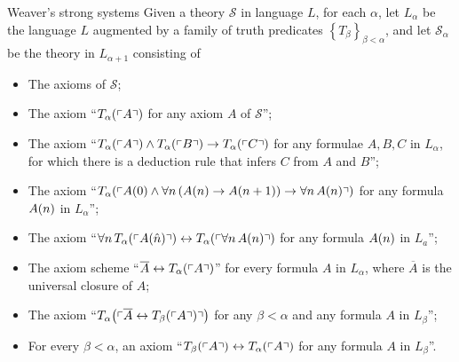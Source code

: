 \documentclass{beamer}
\begin{document}
\begin{frame}{Weaver's strong systems}
  Given a theory $\mathcal{S}$ in language $L$, for each $\alpha$, let $L_\alpha$ be the language $L$ augmented by a family of truth predicates $\left\{T_\beta\right\}_{\beta < \alpha}$, and let $\mathcal{S}_\alpha$ be the theory in $L_{\alpha + 1}$ consisting of
  \begin{itemize}
    \small
    \item The axioms of $\mathcal{S}$;
    \item The axiom ``$T_\alpha\mleft(\left\ulcorner A \right\urcorner\mright)$ for any axiom $A$ of $\mathcal{S}$'';
    \item The axiom ``$T_\alpha\mleft(\left\ulcorner A \right\urcorner\mright) \land T_\alpha\mleft(\left\ulcorner B \right\urcorner\mright) \rightarrow T_\alpha\mleft(\left\ulcorner C \right\urcorner\mright)$ for any formulae $A, B ,C$ in $L_\alpha$, for which there is a deduction rule that infers $C$ from $A$ and $B$'';
    \item The axiom ``$T_\alpha\mleft(\left\ulcorner A\mleft(0\mright) \land \forall n \left(A\mleft(n\mright) \rightarrow A\mleft(n + 1\mright)\right) \rightarrow \forall n \, A\mleft(n\mright) \right\urcorner\mright)$ for any formula $A\mleft(n\mright)$ in $L_\alpha$'';
    \item The axiom ``$\forall n \, T_\alpha\mleft(\left\ulcorner A\mleft(\hat{n}\mright) \right\urcorner\mright) \leftrightarrow T_\alpha\mleft(\left\ulcorner \forall n \, A\mleft(n\mright) \right\urcorner\mright)$ for any formula $A\mleft(n\mright)$ in $L_a$'';
    \item The axiom scheme ``$\overline{A} \leftrightarrow T_\alpha\mleft(\left\ulcorner A \right\urcorner\mright)$'' for every formula $A$ in $L_\alpha$, where $\overline{A}$ is the universal closure of $A$;
    \item The axiom ``$T_\alpha\mleft(\left\ulcorner \overline{A} \leftrightarrow T_\beta\mleft(\left\ulcorner A \right\urcorner\mright) \right\urcorner\mright)$ for any $\beta < \alpha$ and any formula $A$ in $L_\beta$'';
    \item For every $\beta < \alpha$, an axiom ``$T_\beta\mleft(\left\ulcorner A \right\urcorner\mright) \leftrightarrow T_\alpha\mleft(\left\ulcorner A \right\urcorner\mright)$ for any formula $A$ in $L_\beta$''.
  \end{itemize}
\end{frame}
\end{document}
